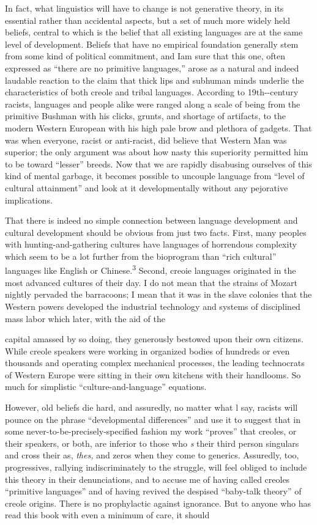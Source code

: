 In fact, what linguistics will have to change is not generative theory, in its essential rather than accidental aspects, but a set of much more widely held beliefs, central to which is the belief that all existing languages are at the same level of development. Beliefs that have no empirical foundation generally stem from some kind of politi\-cal commitment, and Iam sure that this one, often expressed as ``there are no primitive languages,'' arose as a natural and indeed laudable reaction to the claim that thick lips and subhuman minds underlie the characteristics of both creole and tribal languages. According to 19th-{}-century racists, languages and people alike were ranged along a scale of being from the primitive Bushman with his clicks, grunts, and shortage of artifacts, to the modern Western European with his high pale brow and plethora of gadgets. That was when everyone, racist or anti-racist, did believe that Western Man was superior; the only argument was about how nasty this superiority permitted him to be toward ``lesser'' breeds. Now that we are rapidly disabusing our\-selves of this kind of mental garbage, it becomes possible to uncouple language from ``level of cultural attainment'' and look at it develop\-mentally without any pejorative implications.

That there is indeed no simple connection between language development and cultural development should be obvious from just two facts. First, many peoples with hunting-and-gathering cultures have languages of horrendous complexity which seem to be a lot further from the bioprogram than ``rich cultural'' languages like English or Chinese.\textsuperscript{3} Second, creoie languages originated in the most advanced cultures of their day. I do not mean that the strains of Mozart nightly pervaded the barracoons; I mean that it was in the slave colonies that the Western powers developed the industrial technology and systems of disciplined mass labor which later, with the aid of the

capital amassed by so doing, they generously bestowed upon their own citizens. While creole speakers were working in organized bodies of hundreds or even thousands and operating complex mechanical processes, the leading technocrats of Western Europe were sitting in their own kitchens with their handlooms. So much for simplistic ``culture-and-language'' equations.


However, old beliefs die hard, and assuredly, no matter what l say, racists will pounce on the phrase ``developmental differences'' and use it to suggest that in some never-to-be-precisely-specified fashion my work ``proves'' that creoles, or their speakers, or both, are inferior to those who \textit{s} their third person singulars and cross their as, \textit{thes,} and zeros when they come to generics. Assuredly, too, progressives, rallying indiscriminately to the struggle, will feel obliged to include this theory in their denunciations, and to accuse me of having called creoles ``primi\-tive languages'' and of having revived the despised ``baby-talk theory'' of creole origins. There is no prophylactic against ignorance. But to anyone who has read this book with even a minimum of care, it should

